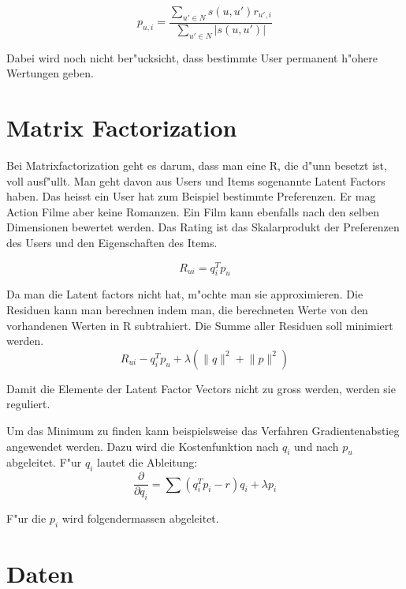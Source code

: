 \documentclass[a4paper, 11pt]{article}
\begin{document}
\begin{equation}
  \label{eq:computeprediction}
  p_{u,i} = \frac{\sum_{u' \in N}{s(u,u') r_{u',i}}}{\sum_{u' \in N}{|s(u,u')|}}
\end{equation}

Dabei wird noch nicht ber"ucksicht, dass bestimmte User permanent h"ohere Wertungen geben.

\section{Matrix Factorization}
\label{sec:matrixfactorization}

Bei Matrixfactorization geht es darum, dass man eine R, die d"unn besetzt ist, voll ausf"ullt. Man geht davon aus Users und Items sogenannte Latent Factors haben. Das heisst ein User hat zum Beispiel bestimmte Preferenzen. Er mag Action Filme aber keine Romanzen. Ein Film kann ebenfalls nach den selben Dimensionen bewertet werden. Das Rating ist das Skalarprodukt der Preferenzen des Users und den Eigenschaften des Items.

\begin{equation}
  \label{eq:latentfactors}
  R_{ui} = q_i^T p_u
\end{equation}

Da man die Latent factors nicht hat, m"ochte man sie approximieren. Die Residuen kann man berechnen indem man, die berechneten Werte von den vorhandenen Werten in R subtrahiert. Die Summe aller Residuen soll minimiert werden.
\begin{equation}
  \label{eq:optimization}
    R_{ui} - q_i^T p_u + \lambda (\lVert q \rVert^2 + \lVert p \lVert ^2)
\end{equation}

Damit die Elemente der Latent Factor Vectors nicht zu gross werden, werden sie reguliert.
 
Um das Minimum zu finden kann beispielsweise das Verfahren Gradientenabstieg angewendet werden. Dazu wird die Kostenfunktion nach $q_i$ und nach $p_u$ abgeleitet. F"ur $q_i$ lautet die Ableitung:
\begin{equation}
  \label{eq:decx}
  \frac{ \partial }{ \partial q_i } = \sum (q_i^T p_i - r) q_i + \lambda p_i
\end{equation}

F"ur die $p_i$ wird folgendermassen abgeleitet.

\section{Daten}
\label{sec:data}
\end{document}
